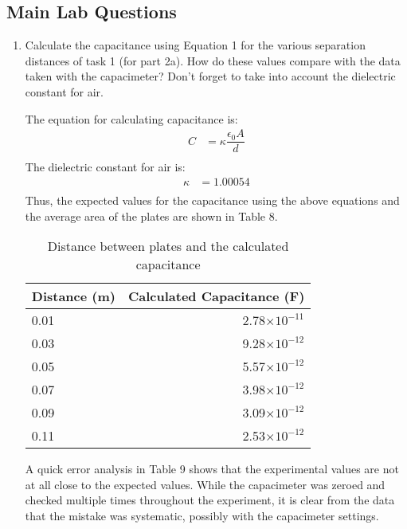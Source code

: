 \documentclass [12pt, letterpaper, twoside] {article}
\begin{document}
\subsection* {Main Lab Questions}
\begin{enumerate}
  \item Calculate the capacitance using Equation 1 for the various separation distances of task 1 (for part 2a). How do these values compare with the data taken with the capacimeter?  Don’t forget to take into account the dielectric constant for air.

  The equation for calculating capacitance is:
  \begin{equation}
    \begin{split}
      C &= \kappa\dfrac{\epsilon_{0}A}{d} \\
    \end{split}
  \end{equation}
  The dielectric constant for air is:
  \begin{equation*}
    \begin{split}
      \kappa &= 1.00054 \\
    \end{split} 
  \end{equation*}
  Thus, the expected values for the capacitance using the above equations and the average area of the plates are shown in Table 8.
  \begin{table}
    \centering
    \begin{tabular}{| l | r |}
      \hline\hline
      Distance (m) & Calculated Capacitance (F) \\
      \hline
      0.01 & 2.78\(\times10^{-11}\) \\ %
      \hline
      0.03 & 9.28\(\times10^{-12}\) \\ %
      \hline
      0.05 & 5.57\(\times10^{-12}\) \\ %
      \hline
      0.07 & 3.98\(\times10^{-12}\) \\ %
      \hline
      0.09 & 3.09\(\times10^{-12}\) \\ %
      \hline
      0.11 & 2.53\(\times10^{-12}\) \\ %
      \hline\hline
    \end{tabular}
    \caption{Distance between plates and the calculated capacitance}
  \end{table}
  A quick error analysis in Table 9 shows that the experimental values are not at all close to the expected values. While the capacimeter was zeroed and checked multiple times throughout the experiment, it is clear from the data that the mistake was systematic, possibly with the capacimeter settings. 


\end{enumerate}
\end{document}
